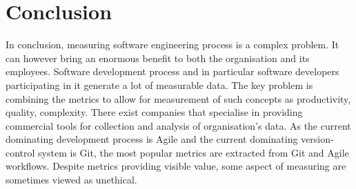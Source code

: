 \documentclass[11pt]{article}
\begin{document}



\section{Conclusion}
\label{sec:Conclusion}
In conclusion, measuring software engineering process is a complex problem. It can however bring an enormous benefit to both the organisation and its employees. Software development process and in particular software developers participating in it generate a lot of measurable data. The key problem is combining the metrics to allow for measurement of such concepts as productivity, quality, complexity. There exist companies that specialise in providing commercial tools for collection and analysis of organisation's data. As the current dominating development process is Agile and the current dominating version-control system is Git, the most popular metrics are extracted from Git and Agile workflows. Despite metrics providing visible value, some aspect of measuring are sometimes viewed as unethical. 


%

 
\end{document}
